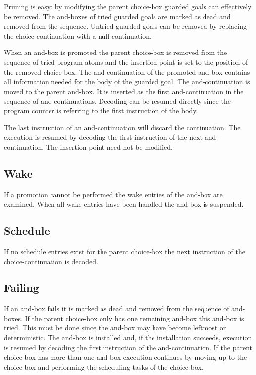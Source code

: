 Pruning is easy: by modifying the parent choice-box guarded goals can
effectively be removed. The and-boxes of tried guarded goals are
marked as dead and removed from the sequence. Untried guarded goals
can be removed by replacing the choice-continuation with a
null-continuation.

When an and-box is promoted the parent choice-box is removed from the
sequence of tried program atoms and the insertion point is set to the
position of the removed choice-box. The and-continuation of the
promoted and-box contains all information needed for the body of the
guarded goal.  The and-continuation is moved to the parent and-box. It
is inserted as the first and-continuation in the sequence of
and-continuations. Decoding can be resumed directly since the program
counter is referring to the first instruction of the body.

The last instruction of an and-continuation will discard the continuation. 
The execution is resumed by decoding the first instruction of the next
and-continuation. The insertion point need not be modified. 

\subsection*{Wake}
If a promotion cannot be performed the wake entries of the and-box
are examined. When all wake entries have been handled the and-box is
suspended. 

\subsection*{Schedule}
If no schedule entries exist for the parent choice-box 
the next instruction of the choice-continuation is decoded. 


\subsection*{Failing}

If an and-box fails it is marked as dead and removed from the sequence
of and-boxes. If the parent choice-box only has one remaining and-box
this and-box is tried. This must be done since the and-box may have
become leftmost or deterministic. The and-box is installed and, if the
installation succeeds, execution is resumed by decoding the first
instruction of the and-continuation. If the parent choice-box has more
than one and-box execution continues by moving up to the choice-box
and performing the scheduling tasks of the choice-box.



